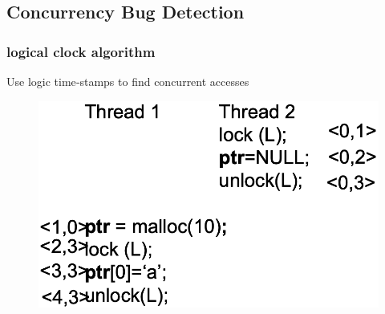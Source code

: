 \subsection{Concurrency Bug Detection} %
% 
%         
% 
% 
% 
% 
% 
% 
% 
% 
% 
\begin{frame}[fragile]
    \frametitle{logical clock algorithm}

Use logic time‐stamps to find concurrent accesses
\pause
    \begin{figure}
    \includegraphics[width=0.45\linewidth]{figs/Happen‐before.png}
    \end{figure}
\end{frame}
